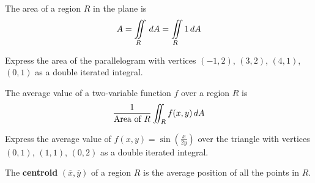 \documentclass[letterpaper, twoside, 12pt]{book}
\begin{document}
          \begin{contributors}

          \end{contributors}

\begin{theorem}
  The area of a region $R$ in the plane is
  \[A = \iint\limits_R\,dA=\iint\limits_R 1\,d{A}\]
\end{theorem}

          \begin{problem}
            Express the area of the parallelogram with vertices
            $(-1,2)$, $(3,2)$, $(4,1)$, $(0,1)$
            as a double iterated integral.
          \end{problem}

          \begin{solution}

          \end{solution}

          \begin{contributors}

          \end{contributors}

\begin{definition}
  The average value of a two-variable function $f$ over a region $R$ is
  \[
    \frac{1}{\text{Area of }R}\iint_R f(x,y)\,d{A}
  \]
\end{definition}

          \begin{problem}
            Express the average value of $f(x,y)=\sin(\frac{x}{2y})$ over
            the triangle with vertices $(0,1)$, $(1,1)$, $(0,2)$
            as a double iterated integral.
          \end{problem}

          \begin{solution}

          \end{solution}

          \begin{contributors}

          \end{contributors}

\begin{definition}
  The \textbf{centroid} $(\overline{x},\overline{y})$ of a region $R$ is the
  average position of all the points in $R$.
\end{definition}
\end{document}
